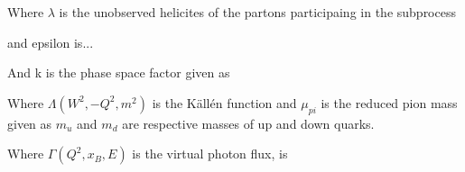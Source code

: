         
        
            Where $\lambda$ is the unobserved helicites of the partons participaing in the subprocess
            
         and epsilon is... 
            
            
            
            
         
               
            And k is the phase space factor given as 
            
                Where $\Lambda(W^2,-Q^2,m^2)$ is the Källén function and $\mu_{pi}$ is the reduced pion mass given as 
            $m_u$ and $m_d$ are respective masses of up and down quarks.
            
             Where $\Gamma (Q^2, x_B, E)$ is the virtual photon flux, is 

\fi

